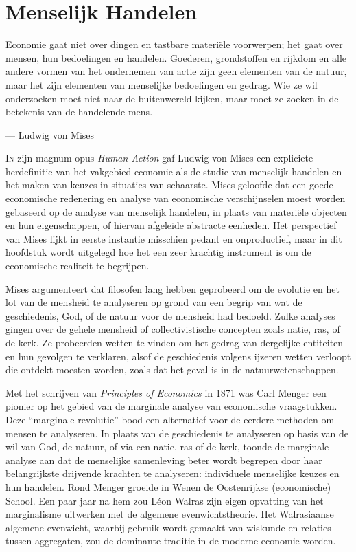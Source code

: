 \chapter{Menselijk Handelen}

\begin{blockquotebox}
    Economie gaat niet over dingen en tastbare materiële voorwerpen; het gaat over mensen, hun bedoelingen en handelen. Goederen, grondstoffen en rijkdom en alle andere vormen van het ondernemen van actie zijn geen elementen van de natuur, maar het zijn elementen van menselijke bedoelingen en gedrag. Wie ze wil onderzoeken moet niet naar de buitenwereld kijken, maar moet ze zoeken in de betekenis van de handelende mens.\footnotemark \par\raggedleft--- Ludwig von Mises
\end{blockquotebox}

\noindent \lettrine{I}n zijn magnum opus \textit{Human Action} gaf Ludwig von Mises een expliciete herdefinitie van het vakgebied economie als de studie van menselijk handelen en het maken van keuzes in situaties van schaarste. Mises geloofde dat een goede economische redenering en analyse van economische verschijnselen moest worden gebaseerd op de analyse van menselijk handelen, in plaats van materiële objecten en hun eigenschappen, of hiervan afgeleide abstracte eenheden. Het perspectief van Mises lijkt in eerste instantie misschien pedant en onproductief, maar in dit hoofdstuk wordt uitgelegd hoe het een zeer krachtig instrument is om de economische realiteit te begrijpen.

Mises argumenteert dat filosofen lang hebben geprobeerd om de evolutie en het lot van de mensheid te analyseren op grond van een begrip van wat de geschiedenis, God, of de natuur voor de mensheid had bedoeld. Zulke analyses gingen over de gehele mensheid of collectivistische concepten zoals natie, ras, of de kerk. Ze probeerden wetten te vinden om het gedrag van dergelijke entiteiten en hun gevolgen te verklaren, alsof de geschiedenis volgens ijzeren wetten verloopt die ontdekt moesten worden, zoals dat het geval is in de natuurwetenschappen.

Met het schrijven van \textit{Principles of Economics} in 1871 was Carl Menger een pionier op het gebied van de marginale analyse van economische vraagstukken. Deze “marginale revolutie” bood een alternatief voor de eerdere methoden om mensen te analyseren. In plaats van de geschiedenis te analyseren op basis van de wil van God, de natuur, of via een natie, ras of de kerk, toonde de marginale analyse aan dat de menselijke samenleving beter wordt begrepen door haar belangrijkste drijvende krachten te analyseren: individuele menselijke keuzes en hun handelen. Rond Menger groeide in Wenen de Oostenrijkse (economische) School. Een paar jaar na hem zou Léon Walras zijn eigen opvatting van het marginalisme uitwerken met de algemene evenwichtstheorie. Het Walrasiaanse algemene evenwicht, waarbij gebruik wordt gemaakt van wiskunde en relaties tussen aggregaten, zou de dominante traditie in de moderne economie worden.

